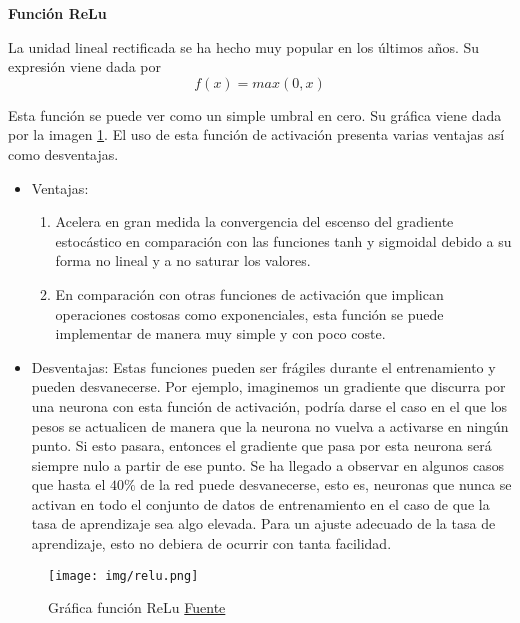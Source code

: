         
    \begin{center}
        \textbf{Función ReLu} \\
    \end{center}
    
        La unidad lineal rectificada se ha hecho muy popular en los últimos años. Su expresión viene dada por
        \begin{equation}
            f(x) = max(0,x)
        \end{equation}
        
        \noindent Esta función se puede ver como un simple umbral en cero. Su gráfica viene dada por la imagen \ref{fig:grafica relu}. El uso de esta función de activación presenta varias ventajas así como desventajas.
        
        \begin{itemize}
            \item Ventajas:
            \begin{enumerate}
                \item Acelera en gran medida la convergencia del escenso del gradiente estocástico en comparación con las funciones tanh y sigmoidal debido a su forma no lineal y a no saturar los valores.
                \item En comparación con otras funciones de activación que implican operaciones costosas como exponenciales, esta función se puede implementar de manera muy simple y con poco coste.
            \end{enumerate}
            \item Desventajas: Estas funciones pueden ser frágiles durante el entrenamiento y pueden desvanecerse. Por ejemplo, imaginemos un gradiente que discurra por una neurona con esta función de activación, podría darse el caso en el que los pesos se actualicen de manera que la neurona no vuelva a activarse en ningún punto. Si esto pasara, entonces el gradiente que pasa por esta neurona será siempre nulo a partir de ese punto. Se ha llegado a observar en algunos casos que hasta el $40\%$ de la red puede desvanecerse, esto es, neuronas que nunca se activan en todo el conjunto de datos de entrenamiento en el caso de que la tasa de aprendizaje sea algo elevada. Para un ajuste adecuado de la tasa de aprendizaje, esto no debiera de ocurrir con tanta facilidad.
            
        \end{itemize}
    
    
        \begin{figure}[H]
            \centering
            \texttt{[image: img/relu.png]}
            \caption{Gráfica función ReLu \href{https://miro.medium.com/max/357/1*oePAhrm74RNnNEolprmTaQ.png}{Fuente}}
            \label{fig:grafica relu}
        \end{figure}
        

